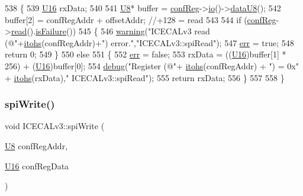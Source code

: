 \begin{DoxyCode}
538 \{
539     \hyperlink{ICECALv3_8h_adf928e51a60dba0df29d615401cc55a8}{U16} rxData;
540 
541     \hyperlink{ICECALv3_8h_a3cb25ca6f51f003950f9625ff05536fc}{U8}* buffer = \hyperlink{classICECALv3_a6e8b6c03f5b0f1d8281bf8a0fa46064f}{confReg}->\hyperlink{classIOobject_af04fb94137c3d86849f478ac5afab5d1}{io}()->\hyperlink{classIOdata_a75e9c318dbac3a39402179070943d4bc}{dataU8}();
542     buffer[2]  = confRegAddr + offsetAddr;                          \textcolor{comment}{//+128 = read   }
543 
544     \textcolor{keywordflow}{if} (\hyperlink{classICECALv3_a6e8b6c03f5b0f1d8281bf8a0fa46064f}{confReg}->\hyperlink{classIOobject_aa07610c11963b1db6710e3c76ceea456}{read}().\hyperlink{classStatusCode_a5dd22dc6eb2c52fc4cabc58f6dea2eb7}{isFailure}()) 
545     \{
546         \hyperlink{classObject_a65cd4fda577711660821fd2cd5a3b4c9}{warning}(\textcolor{stringliteral}{"ICECALv3 read (@"}+\hyperlink{classICECALv3_a04b02e583f191bfce34d05132cd23834}{itohs}(confRegAddr)+\textcolor{stringliteral}{") error."},\textcolor{stringliteral}{"ICECALv3::spiRead"});
547         \hyperlink{classICECALv3_ad8989925ee5b3ff322d863ce6aaff0bd}{err} = \textcolor{keyword}{true};
548         \textcolor{keywordflow}{return} 0;
549     \}
550     \textcolor{keywordflow}{else}
551     \{
552         \hyperlink{classICECALv3_ad8989925ee5b3ff322d863ce6aaff0bd}{err} = \textcolor{keyword}{false};
553         rxData = ((\hyperlink{ICECALv3_8h_adf928e51a60dba0df29d615401cc55a8}{U16})buffer[1] * 256) + (\hyperlink{ICECALv3_8h_adf928e51a60dba0df29d615401cc55a8}{U16})buffer[0];
554         \hyperlink{classObject_aac010553f022165573714b7014a15f0d}{debug}(\textcolor{stringliteral}{"Register (@"}+ \hyperlink{classICECALv3_a04b02e583f191bfce34d05132cd23834}{itohs}(confRegAddr) + \textcolor{stringliteral}{") = 0x"} + \hyperlink{classICECALv3_a04b02e583f191bfce34d05132cd23834}{itohs}(rxData),\textcolor{stringliteral}{"
      ICECALv3::spiRead"});
555         \textcolor{keywordflow}{return} rxData;
556     \}
557 
558 \}
\end{DoxyCode}
\mbox{\label{classICECALv3_aef00f02801dea4bda2093c930501dcdd}} 
\subsubsection{\texorpdfstring{spi\+Write()}{spiWrite()}}
{\footnotesize\ttfamily void I\+C\+E\+C\+A\+Lv3\+::spi\+Write (\begin{DoxyParamCaption}\item[{\hyperlink{ICECALv3_8h_a3cb25ca6f51f003950f9625ff05536fc}{U8}}]{conf\+Reg\+Addr,  }\item[{\hyperlink{ICECALv3_8h_adf928e51a60dba0df29d615401cc55a8}{U16}}]{conf\+Reg\+Data }\end{DoxyParamCaption})\hspace{0.3cm}{\ttfamily [private]}}



